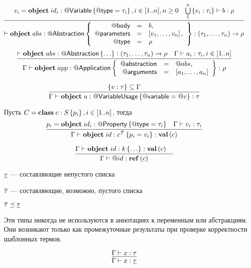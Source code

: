 {\small
$$
\trule{
	v_i = \Object{id_i}{\RefSt{Variable}}{\RefSt{type} = \tau_i}, i \in [1..n], n \ge 0
	&
	\bigcup\limits_1^n \left\{ v_i : \tau_i \right\} \vdash b : \rho
}{
	\vdash \Object{abs}{\RefSt{Abstraction}}{
		\begin{array}{rcl}
			\RefSt{body} &=& b,\\
			\RefSt{parameters} &=& \List{v_1, \ldots, v_n},\\
			\RefSt{type} &=& \rho\\
		\end{array}	
	} : (\tau_1, \ldots, \tau_n) \rightarrow \rho
}{}
$$}
{\small
$$
\trule{
	\vdash \Object{abs}{\RefSt{Abstraction}}{\ldots
	} : (\tau_1, \ldots, \tau_n) \rightarrow \rho
	&
	\Gamma \vdash a_i : \tau_i, i \in [1..n]
}{
	\Gamma \vdash
		\Object{app}{\RefSt{Application}}{
			\begin{array}{rcl}
				\RefSt{abstraction} &=& \Ref{abs},\\
				\RefSt{arguments} &=& \List{a_1, \ldots, a_n}
			\end{array}	
		}
	: \rho
}{}
$$}

$$
\trule{
	\{v : \tau\} \subseteq \Gamma
}{
	\Gamma \vdash 
		\Object{u}{\RefSt{VariableUsage}}{\RefSt{variable} = \Ref{v}} : \tau
}{}
$$ 

Пусть $C = \mathbf{class}\;c : S \left\{p_i\right\}, i \in [1..n]$, тогда
$$
\trule{
	p_i = \Object{id_i}{\RefSt{Property}}{\RefSt{type} = \tau_i} &
	\Gamma \vdash v_i : \tau_i
}{
	\Gamma \vdash \Object{id}{c^\mathcal{T}}{p_i = v_i} : \ClassT{c}
}{}
$$ 

$$
\trule{
	\Gamma \vdash \Object{id}{k}{\ldots} : \ClassT{c} &
}{
	\Gamma \vdash \Ref{id} : \RefT{c}
}{}
$$ 

$\underline{\tau}$ --- составляющие непустого списка

$\overline{\tau}$ --- составляющие, возможно, пустого списка

$\overline{\tau} \preceq \underline{\tau}$

Эти типы никогда не используются в аннотациях к переменным или абстракциям. Они возникают только как промежуточные результаты при проверке корректности шаблонных термов.

$$
\trule{
	\Gamma \vdash x : \tau
}{
	\Gamma \vdash x : \LI{\tau}
}{}
$$ 

